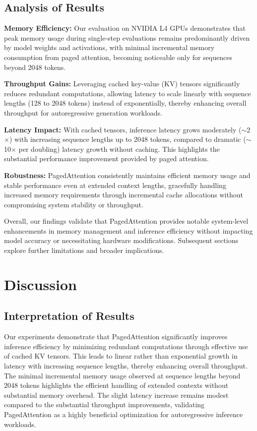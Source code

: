 \documentclass[conference]{IEEEtran}
\begin{document}
\subsection{Analysis of Results}\label{ssec:analysis}
\textbf{Memory Efficiency:} Our evaluation on NVIDIA L4 GPUs demonstrates that peak memory usage during single-step evaluations remains predominantly driven by model weights and activations, with minimal incremental memory consumption from paged attention, becoming noticeable only for sequences beyond 2048 tokens.

\noindent\textbf{Throughput Gains:} Leveraging cached key-value (KV) tensors significantly reduces redundant computations, allowing latency to scale linearly with sequence lengths (128 to 2048 tokens) instead of exponentially, thereby enhancing overall throughput for autoregressive generation workloads.

\noindent\textbf{Latency Impact:} With cached tensors, inference latency grows moderately ($\sim$2$\times$) with increasing sequence lengths up to 2048 tokens, compared to dramatic ($\sim$10$\times$ per doubling) latency growth without caching. This highlights the substantial performance improvement provided by paged attention.

\noindent\textbf{Robustness:} PagedAttention consistently maintains efficient memory usage and stable performance even at extended context lengths, gracefully handling increased memory requirements through incremental cache allocations without compromising system stability or throughput.

Overall, our findings validate that PagedAttention provides notable system-level enhancements in memory management and inference efficiency without impacting model accuracy or necessitating hardware modifications. Subsequent sections explore further limitations and broader implications.
  

\section{Discussion}\label{sec:discussion}

\subsection{Interpretation of Results}\label{ssec:interpretation}
Our experiments demonstrate that PagedAttention significantly improves inference efficiency by minimizing redundant computations through effective use of cached KV tensors. This leads to linear rather than exponential growth in latency with increasing sequence lengths, thereby enhancing overall throughput. The minimal incremental memory usage observed at sequence lengths beyond 2048 tokens highlights the efficient handling of extended contexts without substantial memory overhead. The slight latency increase remains modest compared to the substantial throughput improvements, validating PagedAttention as a highly beneficial optimization for autoregressive inference workloads.
\end{document}
